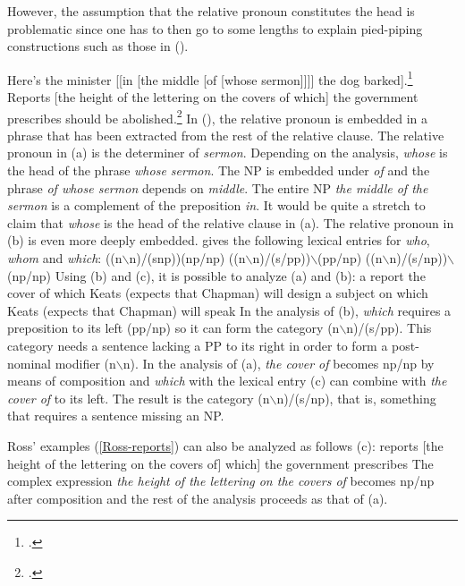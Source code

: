 However, the assumption that the relative pronoun constitutes the head is problematic since one has to then go to some lengths to explain pied-piping
constructions such as those in ().

\eal
\ex\label{Beispiel-Minister}
Here's the minister [[in [the middle [of [whose sermon]]]] the dog barked].\footnote{%
.
}
\ex Reports [the height of the lettering on the covers of which] the government prescribes should be
abolished.\label{Ross-reports}\footnote{%
.\nocite{Ross86a-u}
}
\zl
In (), the relative pronoun is embedded in a phrase that has been extracted from the rest of the relative clause. The relative pronoun
in (a) is the determiner of \emph{sermon}. Depending on the analysis, \emph{whose} is the head of the phrase \emph{whose sermon}.
The NP is embedded under \emph{of} and the phrase \emph{of whose sermon} depends on \emph{middle}. The entire NP \emph{the middle of the sermon}
is a complement of the preposition \emph{in}. It would be quite a stretch to claim that \emph{whose} is the head of the relative clause in (a).
The relative pronoun in (b) is even more deeply embedded.
\citet[]{Steedman97a} gives the following lexical entries for \emph{who},
\emph{whom} and \emph{which}:
\eal
\label{le-relpron-Steedman}
\settowidth{}
\ex ((n$\backslash$n)/(s\bs np))\bs (np/np)       
\ex ((n$\backslash$n)/(s/pp))$\backslash$(pp/np)  
\ex ((n$\backslash$n)/(s/np))$\backslash$(np/np)  
\zl
Using (b) and (c), it is possible to analyze (a) and (b):
\eal
\ex a report the cover of which Keats (expects that Chapman) will design
\ex a subject on which Keats (expects that Chapman) will speak
\zl
In the analysis of (b), \emph{which} requires a preposition to its left (pp/np) so it can form the category
(n$\backslash$n)/(s/pp). This category needs a sentence lacking a PP to its right in order to form a post-nominal
modifier (n$\backslash$n). In the analysis of (a), \emph{the cover of} becomes np/np by means
of composition and \emph{which} with the lexical entry (c) can combine with \emph{the cover of} to its left. The result is
the category (n$\backslash$n)/(s/np), that is, something that requires a sentence missing an NP.

Ross' examples (\ref{Ross-reports}) can also be analyzed as follows (c):
\ea
reports [the height of the lettering on the covers of]
which] the government prescribes
\z
The complex expression \emph{the height of the lettering on the covers of} becomes np/np after composition and the rest of the analysis
proceeds as that of (a).

